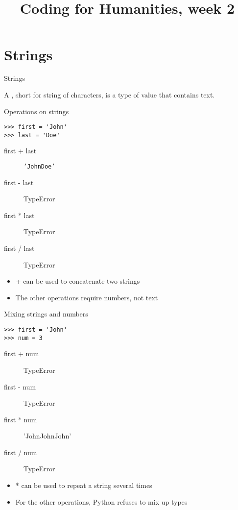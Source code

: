 \documentclass{beamer}
\title{Coding for Humanities, week 2}
\begin{document}
\begin{frame}
 \titlepage
\end{frame}

\begin{frame}
 \tableofcontents
\end{frame}

\frame{\tableofcontents[currentsection]}
\section{Strings}
\begin{frame}{Strings}
    \begin{definition}
        A , short for string of characters,
        is a type of value that contains text.
    \end{definition}

\end{frame}

\begin{frame}[fragile]{Operations on strings}
\begin{lstlisting}
>>> first = 'John'
>>> last = 'Doe'
\end{lstlisting}
\begin{description}
    \item[first + last] \texttt{'JohnDoe'}
    \item[first - last] TypeError
    \item[first * last] TypeError
    \item[first / last] TypeError
\end{description}

\begin{itemize}
\item + can be used to concatenate two strings
\item The other operations require numbers, not text
\end{itemize}
\end{frame}

\begin{frame}[fragile]{Mixing strings and numbers}
\begin{lstlisting}
>>> first = 'John'
>>> num = 3
\end{lstlisting}
\begin{description}
    \item[first + num] TypeError
    \item[first - num] TypeError
    \item[first * num] 'JohnJohnJohn'
    \item[first / num] TypeError
\end{description}

\begin{itemize}
\item * can be used to repeat a string several times
\item For the other operations, Python refuses to mix up types
\end{itemize}
\end{frame}
\end{document}
